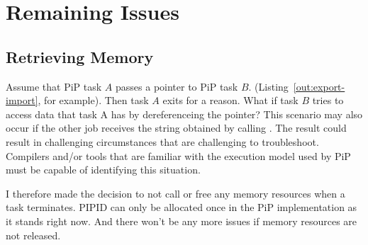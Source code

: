 
\section{Remaining Issues}

\subsection{Retrieving Memory}\label{sec:retrive}

Assume that PiP task $A$ passes a pointer to PiP task
$B$. (Listing~\ref{out:export-import}, 
for example). Then task $A$ exits for a reason. What if task $B$ tries to
access data that task A has by dereferenceing the pointer? This
scenario may also occur if the other job receives the string obtained
by calling . The result could result in challenging
circumstances that are challenging to troubleshoot. Compilers and/or
tools that are familiar with the execution model used by PiP must be
capable of identifying this situation.

I therefore made the decision to not call  or free
any memory resources when a task terminates. PIPID can only be allocated once
in the PiP implementation as it stands right now. And there won't be
any more issues if memory resources are not released.
